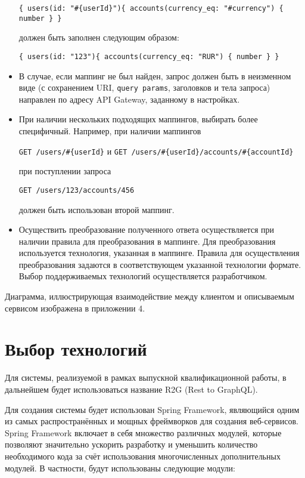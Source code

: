 \begin{itemize}
    \texttt{\{ users(id: "\#\{userId\}")\{ accounts(currency\_eq: "\#{currency}") \{ number \} \}}

    должен быть заполнен следующим образом:

    \texttt{\{ users(id: "123")\{ accounts(currency\_eq: "RUR") \{ number \} \}}

    \item В случае, если маппинг не был найден, запрос должен быть в неизменном виде (с сохранением URI, \texttt{query params}, заголовков и тела запроса) направлен по адресу API Gateway, заданному в настройках.

    \item При наличии нескольких подходящих маппингов, выбирать более специфичный.
    Например, при наличии маппингов

    \texttt{GET /users/\#\{userId\}} и \texttt{GET /users/\#\{userId\}/accounts/\#\{accountId\}}

    при поступлении запроса

    \texttt{GET /users/123/accounts/456}

    должен быть использован второй маппинг.

    \item Осуществить преобразование полученного ответа осуществляется при наличии правила для преобразования в маппинге.
    Для преобразования используется технология, указанная в маппинге.
    Правила для осуществления преобразования задаются в соответствующем указанной технологии формате.
    Выбор поддерживаемых технологий осуществляется разработчиком.
\end{itemize}

Диаграмма, иллюстрирующая взаимодействие между клиентом и описываемым сервисом изображена в приложении 4.

\section{Выбор технологий}\label{sec:choose-technology}

Для системы, реализуемой в рамках выпускной квалификационной работы, в дальнейшем будет использоваться название R2G (Rest to GraphQL).

Для создания системы будет использован Spring Framework, являющийся одним из самых распространённых и мощных фреймворков для создания веб-сервисов.
Spring Framework включает в себя множество различных модулей, которые позволяют значительно ускорить разработку и уменьшить количество необходимого кода за счёт использования многочисленных дополнительных модулей.
В частности, будут использованы следующие модули:

